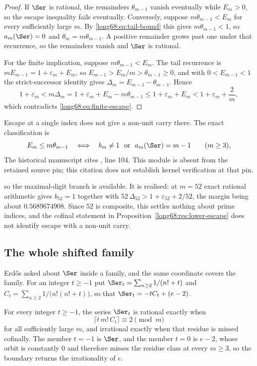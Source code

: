 \begin{proof}
If $\Ser$ is rational, the remainders $\theta_{m-1}$ vanish eventually while
$E_m>0$, so the escape inequality fails eventually.  Conversely, suppose
$m\theta_{m-1}<E_m$ for every sufficiently large $m$.  By
\eqref{long68:eq:tail-bound} this gives $m\theta_{m-1}<1$, so $a_m(\Ser)=0$ and
$\theta_m=m\theta_{m-1}$.  A positive remainder grows past one under that
recurrence, so the remainders vanish and $\Ser$ is rational.

For the finite implication, suppose $m\theta_{m-1}<E_m$.  The tail recurrence
is $mE_{m-1}=1+\varepsilon_m+E_m$, so $E_{m-1}>E_m/m>\theta_{m-1}\ge0$, and
with $0<E_{m-1}<1$ the strict-successor identity gives
$\Delta_m=E_{m-1}-\theta_{m-1}$.  Hence
\[
 1+\varepsilon_m<m\Delta_m=1+\varepsilon_m+E_m-m\theta_{m-1}
 \le1+\varepsilon_m+E_m<1+\varepsilon_m+\frac2m,
\]
which contradicts \eqref{long68:eq:finite-escape}.
\end{proof}

Escape at a single index does not give a non-unit carry there.  The exact
classification is
\begin{equation}\label{long68:eq:escape-classification}
 E_m\le m\theta_{m-1}
 \quad\Longleftrightarrow\quad
 b_m\ne1\ \hbox{ or }\ a_m(\Ser)=m-1
 \qquad(m\ge3),
\end{equation}
  The historical manuscript cites , line 104. This module is absent from the retained source pin; this citation does not establish kernel verification at that pin.

so the maximal-digit branch is available.  It is realised: at $m=52$ exact
rational arithmetic gives $b_{52}=1$ together with
$52\,\Delta_{52}>1+\varepsilon_{52}+2/52$, the margin being about
$0.5689674908$.  Since $52$ is composite, this settles nothing about
prime indices, and the cofinal statement in
Proposition~\ref{long68:res:lower-escape} does not identify escape with a non-unit
carry.

\subsection{The whole shifted family}

Erd\H{o}s asked about $\Ser$ inside a family, and the same coordinate covers
the family.  For an integer $t\ge-1$ put
$\Ser_t=\sum_{n\ge2}1/(n!+t)$ and $C_t=\sum_{n\ge2}1/\bigl(n!(n!+t)\bigr)$,
so that $\Ser_t=-tC_t+(e-2)$.

\begin{theorem}\label{long68:res:shift-family}
For every integer $t\ge-1$, the series $\Ser_t$ is rational exactly when
\[
 \bigl\lceil t\,m!\,C_t\bigr\rceil\equiv2\pmod m
\]
for all sufficiently large $m$, and irrational exactly when that residue is
missed cofinally.  The member $t=-1$ is $\Ser$, and the member $t=0$ is
$e-2$, whose orbit is constantly $0$ and therefore misses the residue class
at every $m\ge3$, so the boundary returns the irrationality of $e$.
\end{theorem}

